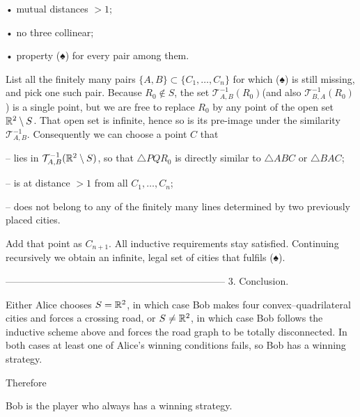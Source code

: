 • mutual distances  \(>1\);  

• no three collinear;  

• property (♠) for every pair among them.

List all the finitely many pairs \(\{A,B\}\subset \{C_{1},\dots ,C_{n}\}\)
for which (♠) is still missing, and pick one such pair.
Because \(R_{0}\notin S\), the set
\(\mathcal T_{A,B}^{-1}(R_{0})\)\;(and also
\(\mathcal T_{B,A}^{-1}(R_{0})\)) is a single point, but we are free to
replace \(R_{0}\) by any point of the open set \(\Bbb R^{2}\setminus S\).
That open set is infinite, hence so is its
pre-image under the similarity \(\mathcal T_{A,B}^{-1}\).
Consequently we can choose a point \(C\) that

– lies in \(\mathcal T_{A,B}^{-1}(\Bbb R^{2}\setminus S)\),  
so that \(\triangle PQR_{0}\) is directly similar
to \(\triangle ABC\) or \(\triangle BAC\);  

– is at distance \(>1\) from all \(C_{1},\dots ,C_{n}\);  

– does not belong to any of the finitely many lines determined
by two previously placed cities.

Add that point as \(C_{n+1}\).
All inductive requirements stay satisfied.
Continuing recursively we obtain an infinite, legal set of cities that fulfils (♠).

--------------------------------------------------------------------
3.  Conclusion.

Either Alice chooses \(S=\Bbb R^{2}\), in which case Bob makes four
convex–quadrilateral cities and forces a crossing road, or
\(S\neq\Bbb R^{2}\), in which case Bob follows the inductive scheme above
and forces the road graph to be totally disconnected.
In both cases at least one of Alice’s winning conditions fails,
so Bob has a winning strategy.

Therefore

Bob is the player who always has a winning strategy.